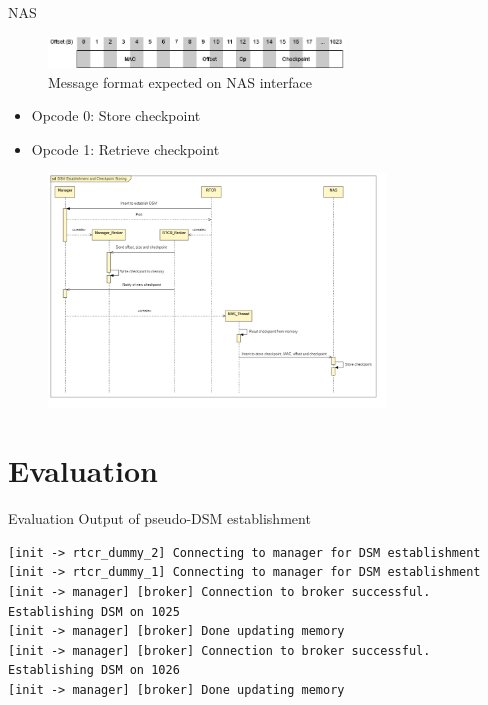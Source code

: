 \documentclass[
  english,            %
  aspectratio=169,    %
]{tumbeamer}
\begin{document}
\begin{frame}{NAS}
\hfill
\begin{figure}
    \centering
    \includegraphics[width=0.7\textwidth]{NAS_message_format_corrected.png}
    \caption{Message format expected on NAS interface}
    \label{fig:router}
\end{figure}
\begin{itemize}
    \item Opcode 0: Store checkpoint
    \item Opcode 1: Retrieve checkpoint
\end{itemize}
\end{frame}

\begin{frame}{}
    \begin{figure}
    \centering
    \includegraphics[width=0.8\textwidth]{dsm-and-store_sequence.png}
    \label{fig:router}
\end{figure}
\end{frame}

\section{Evaluation}
\begin{frame}[fragile]{Evaluation}
Output of pseudo-DSM establishment
\begin{lstlisting}
[init -> rtcr_dummy_2] Connecting to manager for DSM establishment
[init -> rtcr_dummy_1] Connecting to manager for DSM establishment
[init -> manager] [broker] Connection to broker successful. Establishing DSM on 1025
[init -> manager] [broker] Done updating memory
[init -> manager] [broker] Connection to broker successful. Establishing DSM on 1026
[init -> manager] [broker] Done updating memory
\end{lstlisting}
\end{frame}
\end{document}
